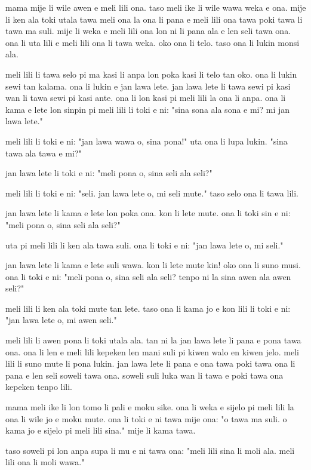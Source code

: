 mama mije li wile awen e meli lili ona. 
taso meli ike li wile wawa weka e ona. 
mije li ken ala toki utala tawa meli ona la ona li pana e meli lili ona tawa poki tawa li tawa ma suli. 
mije li weka e meli lili ona lon ni li pana ala e len seli tawa ona. 
ona li uta lili e meli lili ona li tawa weka. 
oko ona li telo. 
taso ona li lukin monsi ala.

meli lili li tawa selo pi ma kasi li anpa lon poka kasi li telo tan oko. 
ona li lukin sewi tan kalama. 
ona li lukin e jan lawa lete. 
jan lawa lete li tawa sewi pi kasi wan li tawa sewi pi kasi ante.
ona li lon kasi pi meli lili la ona li anpa. 
ona li kama e lete lon sinpin pi meli lili li toki e ni: 
"sina sona ala sona e mi? 
mi jan lawa lete."

meli lili li toki e ni: 
"jan lawa wawa o, sina pona!" 
uta ona li lupa lukin. 
"sina tawa ala tawa e mi?"

jan lawa lete li toki e ni: 
"meli pona o, sina seli ala seli?"

meli lili li toki e ni: 
"seli. 
jan lawa lete o, mi seli mute."
taso selo ona li tawa lili.

jan lawa lete li kama e lete lon poka ona. 
kon li lete mute. 
ona li toki sin e ni: 
"meli pona o, sina seli ala seli?"

uta pi meli lili li ken ala tawa suli. 
ona li toki e ni: 
"jan lawa lete o, mi seli."

jan lawa lete li kama e lete suli wawa. 
kon li lete mute kin! 
oko ona li suno musi. 
ona li toki e ni: 
"meli pona o, sina seli ala seli? 
tenpo ni la sina awen ala awen seli?"

meli lili li ken ala toki mute tan lete. 
taso ona li kama jo e kon lili li toki e ni: 
"jan lawa lete o, mi awen seli." 

meli lili li awen pona li toki utala ala. 
tan ni la jan lawa lete li pana e pona tawa ona. 
ona li len e meli lili kepeken len mani suli pi kiwen walo en kiwen jelo. 
meli lili li suno mute li pona lukin. 
jan lawa lete li pana e ona tawa poki tawa ona li pana e len seli soweli tawa ona. 
soweli suli luka wan li tawa e poki tawa ona kepeken tenpo lili.

mama meli ike li lon tomo li pali e moku sike. 
ona li weka e sijelo pi meli lili la ona li wile jo e moku mute. 
ona li toki e ni tawa mije ona: 
"o tawa ma suli. 
o kama jo e sijelo pi meli lili sina." 
mije li kama tawa. 

taso soweli pi lon anpa supa li mu e ni tawa ona: 
"meli lili sina li moli ala. 
meli lili ona li moli wawa."

